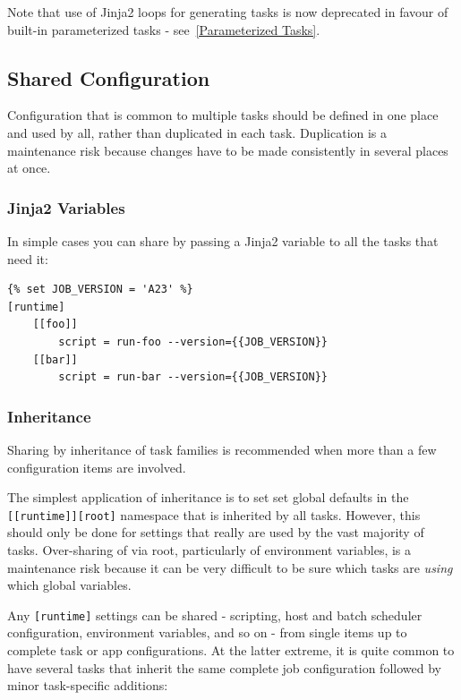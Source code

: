 Note that use of Jinja2 loops for generating tasks is now deprecated in favour
of built-in parameterized tasks - see~\ref{Parameterized Tasks}.

\subsection{Shared Configuration}

Configuration that is common to multiple tasks should be defined in one
place and used by all, rather than duplicated in each task. Duplication is
a maintenance risk because changes have to be made consistently in several
places at once.

\subsubsection{Jinja2 Variables}

In simple cases you can share by passing a Jinja2 variable to all the tasks
that need it:

\lstset{language=suiterc}
\begin{lstlisting}
{% set JOB_VERSION = 'A23' %}
[runtime]
    [[foo]]
        script = run-foo --version={{JOB_VERSION}}
    [[bar]]
        script = run-bar --version={{JOB_VERSION}}
\end{lstlisting}

\subsubsection{Inheritance}

Sharing by inheritance of task families is recommended when more than a few
configuration items are involved.

The simplest application of inheritance is to set set global defaults in the
\lstinline=[[runtime]][root]= namespace that is inherited by all tasks.
However, this should only be done for settings that really are used
by the vast majority of tasks. Over-sharing of via root, particularly of
environment variables, is a maintenance risk because it can be very
difficult to be sure which tasks are {\em using} which global variables.

Any \lstinline=[runtime]= settings can be shared - scripting, host
and batch scheduler configuration, environment variables, and so on - from
single items up to complete task or app configurations.  At the latter extreme,
it is quite common to have several tasks that inherit the same complete
job configuration followed by minor task-specific additions:

